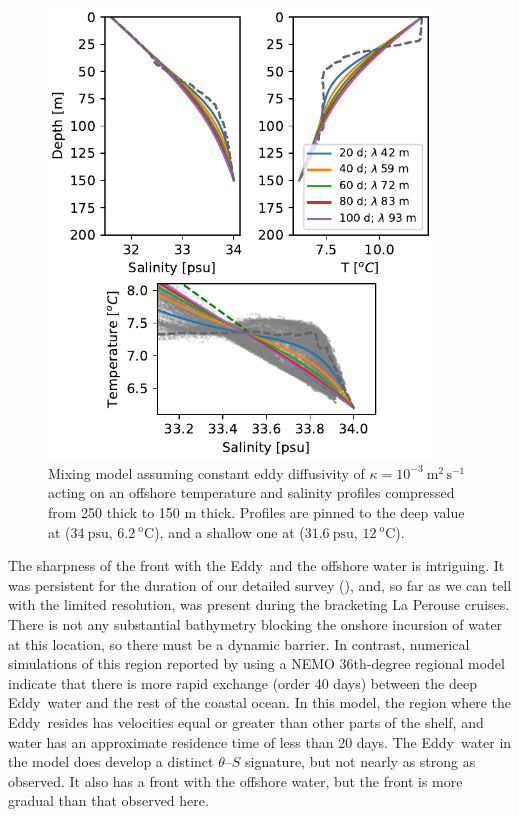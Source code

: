 \documentclass[draft]{agujournal2019}
\newcommand*{\Eddy}{{\sc Eddy}}
\begin{document}
\begin{figure}[htbp]
  \begin{center}
    \includegraphics[width=4in]{TSExercise}
    \caption{Mixing model assuming constant eddy diffusivity of $\kappa = 10^{-3}\ \mathrm{m^2\,s^{-1}}$ acting on an offshore temperature and salinity profiles compressed from 250 thick to 150 m thick.  Profiles are pinned to the deep value at ($34\ \mathrm{psu}$, $6.2\ \mathrm{^oC}$), and a shallow one at ($31.6\ \mathrm{psu}$, $12\ \mathrm{^oC}$).
      \label{fig:TSExercise} }
  \end{center}
\end{figure}

The sharpness of the front with the \Eddy\ and the offshore water is intriguing.  It was persistent for the duration of our detailed survey (), and, so far as we can tell with the limited resolution, was present during the bracketing La Perouse cruises. There is not any substantial bathymetry blocking the onshore incursion of water at this location, so there must be a dynamic barrier. In contrast, numerical simulations of this region reported by \cite{sahuetal22} using a NEMO 36th-degree regional model  indicate that there is more rapid exchange (order 40 days) between the deep \Eddy\ water and the rest of the coastal ocean.  In this model, the region where the \Eddy\ resides has velocities equal or greater than other parts of the shelf, and water has an approximate residence time of less than 20 days.  The \Eddy\ water in the model does develop a distinct $\theta$--$S$ signature, but not nearly as strong as observed.  It also has a front with the offshore water, but the front is more gradual than that observed here.
\end{document}
